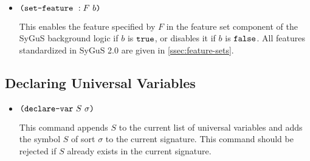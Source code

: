 \documentclass[english,a4paper,10pt]{article}
\begin{document}
\begin{itemize}
\begin{comment}
\item $\paren{\setlogicoutputkwd\mbox{ }S}$

This sets the output logic component of the SyGuS background logic
to the one $S$ refers to.
This command imposes the same restrictions on logics
as the previous command, and adds the set of sort and function symbols
from the logic to the current signature.

\item $\paren{\setfeaturesetkwd\mbox{ }S}$

This sets the feature set component of the SyGuS background logic
to the one specified by symbol $S$.
We do not standardize any examples of feature sets
in this document.
We remark that a feature set may correspond to a class of synthesis problems,
for example, synthesis conjectures having
a single non-recursive function-to-synthesize.
\end{comment}

\item $\texttt{(}\texttt{set-feature}\mbox{ }:F\mbox{ }b\texttt{)}$

This enables the feature specified by $F$
in the feature set component of the SyGuS background logic
if $b$ is $\texttt{true}$, or disables it if $b$ is $\texttt{false}$.
All features standardized in SyGuS 2.0
are given in \cref{ssec:feature-sets}.

\end{itemize}

\subsection{Declaring Universal Variables}

\begin{itemize}
\item $\texttt{(}\texttt{declare-var}\mbox{ }S\mbox{ }\sigma\texttt{)}$

This command appends $S$ to the current list of universal variables
and adds the symbol $S$ of sort $\sigma$ to the current signature.
This command should be rejected if $S$ already
exists in the current signature.





\end{itemize}
\end{document}

